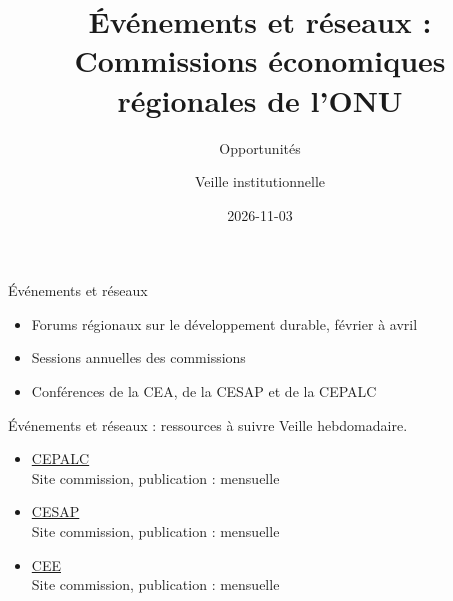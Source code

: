 \documentclass[aspectratio=169,11pt]{beamer}
\title{Événements et réseaux : Commissions économiques régionales de l'ONU}
\subtitle{Opportunités}
\author{Veille institutionnelle}
\date{2026-11-03}
\begin{document}
\begin{frame}\titlepage\end{frame}

\begin{frame}{Événements et réseaux}
\begin{itemize}
\item Forums régionaux sur le développement durable, février à avril
\item Sessions annuelles des commissions
\item Conférences de la CEA, de la CESAP et de la CEPALC
\end{itemize}
\end{frame}

\begin{frame}{Événements et réseaux : ressources à suivre}
\small
Veille hebdomadaire.
\begin{itemize}
\item \href{https://www.cepal.org}{CEPALC}\\{\footnotesize Site commission, publication : mensuelle}
\item \href{https://www.unescap.org}{CESAP}\\{\footnotesize Site commission, publication : mensuelle}
\item \href{https://unece.org}{CEE}\\{\footnotesize Site commission, publication : mensuelle}
\end{itemize}
\end{frame}
\end{document}
